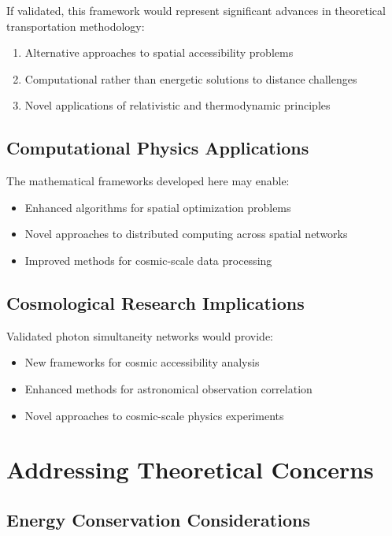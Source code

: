 \documentclass[12pt,a4paper]{article}
\begin{document}
If validated, this framework would represent significant advances in theoretical transportation methodology:

\begin{enumerate}
\item Alternative approaches to spatial accessibility problems
\item Computational rather than energetic solutions to distance challenges
\item Novel applications of relativistic and thermodynamic principles
\end{enumerate}

\subsection{Computational Physics Applications}

The mathematical frameworks developed here may enable:

\begin{itemize}
\item Enhanced algorithms for spatial optimization problems
\item Novel approaches to distributed computing across spatial networks
\item Improved methods for cosmic-scale data processing
\end{itemize}

\subsection{Cosmological Research Implications}

Validated photon simultaneity networks would provide:

\begin{itemize}
\item New frameworks for cosmic accessibility analysis
\item Enhanced methods for astronomical observation correlation
\item Novel approaches to cosmic-scale physics experiments
\end{itemize}

\section{Addressing Theoretical Concerns}

\subsection{Energy Conservation Considerations}
\end{document}
